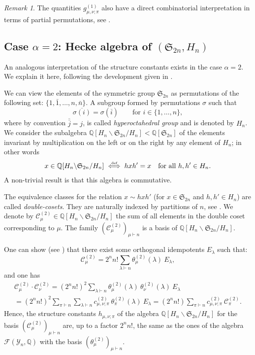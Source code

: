 \documentclass[11pt]{amsart}
\theoremstyle{plain}
\theoremstyle{remark}
\newtheorem*{remark}{Remark}
\newcommand{\F}{\mathcal{F}}
\newcommand{\Sym}[1]{\mathfrak{S}_{#1}}
\newcommand{\QQ}{\mathbb{Q}}
\newcommand{\cl}{\mathcal{C}}
\newcommand{\Young}{\mathcal{Y}}
\begin{document}
\begin{remark}
    The quantities $g^{(1)}_{\mu,\nu;\pi}$ also have a direct combinatorial interpretation
    in terms of partial permutations, see \cite{IvanovKerovPartialPermutations}.
\end{remark}

\subsection{Case $\alpha=2$: Hecke algebra of $(\Sym{2n},H_n)$}

\label{SubsectHecke}
An analogous interpretation of the structure constants exists in the case $\alpha=2$.
We explain it here, following the development given in \cite{GouldenJacksonMapsZonal}.

We can view the elements of the symmetric group $\Sym{2n}$ as permutations of the following set:
$\{1,\bar{1},\dots,n,\bar{n}\}$.
A subgroup formed by permutations $\sigma$ such that 
\[\overline{\sigma(i)} = \sigma(\overline{i})\qquad \text{for } i\in\{1,\dots,n\},\]
where by convention $\overline{\bar{j}}=j$, is called \emph{hyperoctahedral group} and is denoted by $H_n$.
We consider the subalgebra $\QQ[H_n \backslash \Sym{2n} / H_n] < \QQ[\Sym{2n}]$ of the elements
invariant by multiplication on the left or on the right by any element of $H_n$;
in other words
\[x \in \QQ[H_n \backslash \Sym{2n} / H_n] \stackrel{\text{\tiny def}}{\iff}
h x h'=x \quad \text{for all }h,h' \in H_n.\]
A non-trivial result is that this algebra is commutative.

The equivalence classes for the relation $x \sim hxh'$ (for $x \in \Sym{2n}$ and $h,h' \in H_n$)
are called \emph{double-cosets}.
They are naturally indexed by partitions of $n$, see \cite[(VII,2)]{Macdonald1995}.
We denote by $\cl^{(2)}_\mu \in \QQ[H_n \backslash \Sym{2n} / H_n]$ the sum
of all elements in the double coset corresponding to $\mu$.
The family $(\cl^{(2)}_\mu)_{\mu \vdash n}$ is a basis of $\QQ[H_n \backslash \Sym{2n} / H_n]$.

One can show (see \cite[Equation~(3) and (5)]{GouldenJacksonMapsZonal}) that
there exist some
orthogonal idempotents $E_\lambda$ such that:
\[ \cl^{(2)}_\mu = 2^n n! \sum_{\lambda \vdash n} \theta_\mu^{(2)}(\lambda)\ E_\lambda,\]
and one has
\begin{multline*}
    \cl^{(2)}_\mu \cdot \cl^{(2)}_\nu
= (2^n n!)^2 \sum_{\lambda \vdash n} \theta_\mu^{(2)}(\lambda)\ \theta_\nu^{(2)}(\lambda)\ E_\lambda\\
= (2^n n!)^2 \sum_{\pi \vdash n} \sum_{\lambda \vdash n} c_{\mu,\nu;\pi}^{(2)}\
\theta_\pi^{(2)}(\lambda)\ E_\lambda
=  (2^n n!) \sum_{\pi \vdash n} c_{\mu,\nu;\pi}^{(2)}\ \cl^{(2)}_\pi.
\end{multline*}
Hence, the structure constants $h_{\mu,\nu;\pi}$ of the algebra $\QQ[H_n \backslash \Sym{2n} / H_n]$
for the basis $(\cl^{(2)}_\mu)_{\mu \vdash n}$ are,
up to a factor $2^n n!$, the same as the ones of the algebra
$\F(\Young_n,\QQ)$ with the basis $(\theta_\mu^{(2)})_{\mu \vdash n}$.
\end{document}
